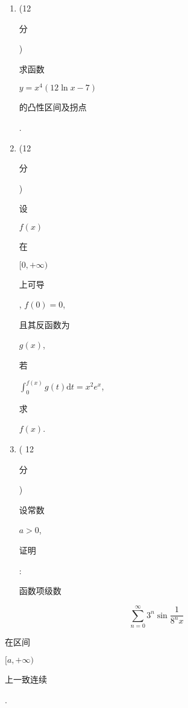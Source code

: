 \documentclass[10pt]{article}
\begin{document}
\begin{enumerate}
  \item (12 \begin{CJK}{UTF8}{mj}分\end{CJK}) \begin{CJK}{UTF8}{mj}求函数\end{CJK} $y=x^{4}(12 \ln x-7)$ \begin{CJK}{UTF8}{mj}的凸性区间及拐点\end{CJK}.

  \item (12 \begin{CJK}{UTF8}{mj}分\end{CJK}) \begin{CJK}{UTF8}{mj}设\end{CJK} $f(x)$ \begin{CJK}{UTF8}{mj}在\end{CJK} $[0,+\infty)$ \begin{CJK}{UTF8}{mj}上可导\end{CJK}, $f(0)=0$, \begin{CJK}{UTF8}{mj}且其反函数为\end{CJK} $g(x)$, \begin{CJK}{UTF8}{mj}若\end{CJK} $\int_{0}^{f(x)} g(t) \mathrm{d} t=x^{2} e^{x}$, \begin{CJK}{UTF8}{mj}求\end{CJK} $f(x)$.

  \item ( 12 \begin{CJK}{UTF8}{mj}分\end{CJK}) \begin{CJK}{UTF8}{mj}设常数\end{CJK} $a>0$, \begin{CJK}{UTF8}{mj}证明\end{CJK}: \begin{CJK}{UTF8}{mj}函数项级数\end{CJK}

\end{enumerate}
$$
\sum_{n=0}^{\infty} 3^{n} \sin \frac{1}{8^{n} x}
$$
\begin{CJK}{UTF8}{mj}在区间\end{CJK} $[a,+\infty)$ \begin{CJK}{UTF8}{mj}上一致连续\end{CJK}.
\end{document}
